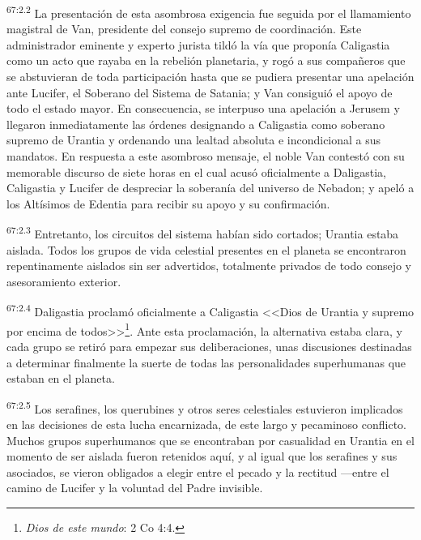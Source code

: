 \par
\textsuperscript{67:2.2} La presentación de esta asombrosa exigencia fue seguida por el llamamiento magistral de Van, presidente del consejo supremo de coordinación. Este administrador eminente y experto jurista tildó la vía que proponía Caligastia como un acto que rayaba en la rebelión planetaria, y rogó a sus compañeros que se abstuvieran de toda participación hasta que se pudiera presentar una apelación ante Lucifer, el Soberano del Sistema de Satania; y Van consiguió el apoyo de todo el estado mayor. En consecuencia, se interpuso una apelación a Jerusem y llegaron inmediatamente las órdenes designando a Caligastia como soberano supremo de Urantia y ordenando una lealtad absoluta e incondicional a sus mandatos. En respuesta a este asombroso mensaje, el noble Van contestó con su memorable discurso de siete horas en el cual acusó oficialmente a Daligastia, Caligastia y Lucifer de despreciar la soberanía del universo de Nebadon; y apeló a los Altísimos de Edentia para recibir su apoyo y su confirmación.

\par
\textsuperscript{67:2.3} Entretanto, los circuitos del sistema habían sido cortados; Urantia estaba aislada. Todos los grupos de vida celestial presentes en el planeta se encontraron repentinamente aislados sin ser advertidos, totalmente privados de todo consejo y asesoramiento exterior.

\par
\textsuperscript{67:2.4} Daligastia proclamó oficialmente a Caligastia <<Dios de Urantia y supremo por encima de todos>>\footnote{\textit{Dios de este mundo}: 2 Co 4:4.}. Ante esta proclamación, la alternativa estaba clara, y cada grupo se retiró para empezar sus deliberaciones, unas discusiones destinadas a determinar finalmente la suerte de todas las personalidades superhumanas que estaban en el planeta.

\par
\textsuperscript{67:2.5} Los serafines, los querubines y otros seres celestiales estuvieron implicados en las decisiones de esta lucha encarnizada, de este largo y pecaminoso conflicto. Muchos grupos superhumanos que se encontraban por casualidad en Urantia en el momento de ser aislada fueron retenidos aquí, y al igual que los serafines y sus asociados, se vieron obligados a elegir entre el pecado y la rectitud ---entre el camino de Lucifer y la voluntad del Padre invisible.

